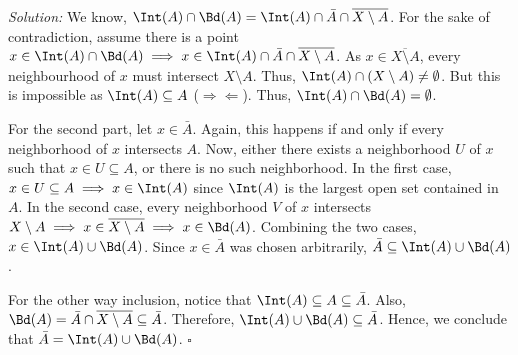 
\emph{Solution:} We know,
$\Int(A)\cap\Bd(A)=\Int(A)\cap\bar{A}\cap\overline{X\setminus A}$. For the sake of
contradiction, assume there is a point
$x\in\Int(A)\cap\Bd(A)\implies x\in\Int(A)\cap\bar{A}\cap\overline{X\setminus A}$. As
$x\in\overline{X\setminus A}$, every neighbourhood of $x$ must intersect $X\setminus A$.
Thus, $\Int(A)\cap(X\setminus A)\neq\emptyset$. But this is impossible as
$\Int(A)\subseteq A$ ($\Rightarrow\!\Leftarrow$). Thus, $\Int(A)\cap\Bd(A)=\emptyset$.

For the second part, let $x\in\bar{A}$. Again, this happens if and only if every neighborhood of
$x$ intersects $A$. Now, either there exists a neighborhood $U$ of $x$ such that
$x\in U\subseteq A$, or there is no such neighborhood. In the first case,
$x\in U\subseteq A\implies x\in\Int(A)$ since $\Int(A)$ is the largest open set contained in
$A$. In the second case, every neighborhood $V$ of $x$ intersects
$X\setminus A\implies x\in\overline{X\setminus A}\implies x\in\Bd(A)$. Combining the two cases,
$x\in\Int(A)\cup\Bd(A)$. Since $x\in\bar{A}$ was chosen arbitrarily,
$\bar{A}\subseteq\Int(A)\cup\Bd(A)$.

For the other way inclusion, notice that $\Int(A)\subseteq A\subseteq\bar{A}$. Also,
$\Bd(A)=\bar{A}\cap\overline{X\setminus A}\subseteq\bar{A}$. Therefore,
$\Int(A)\cup\Bd(A)\subseteq\bar{A}$. Hence, we conclude that $\bar{A}=\Int(A)\cup\Bd(A)$.
\hfill$\square$
